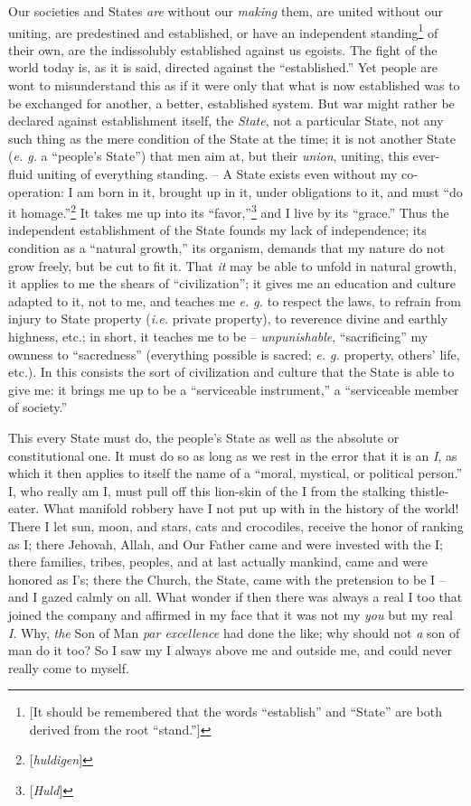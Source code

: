 \documentclass[12pt,a4paper]{book}
\begin{document}
Our societies and States \textit{are} without our \textit{making} them, are 
united without our uniting, are predestined and established, or have an 
independent standing\footnote{[It should be remembered that the words 
``establish'' and ``State'' are both derived from the root ``stand.'']} 
of their own, are the indissolubly established against us egoists. The fight 
of the world today is, as it is said, directed against the ``established.'' 
Yet people are wont to misunderstand this as if it were only that what is now 
established was to be exchanged for another, a better, established system. But 
war might rather be declared against establishment itself, the \textit{State}, 
not a particular State, not any such thing as the mere condition of the State 
at the time; it is not another State (\textit{e. g.} a ``people's State'') 
that men aim at, but their \textit{union}, uniting, this ever-fluid uniting of 
everything standing. -- A State exists even without my co-operation: I am born 
in it, brought up in it, under obligations to it, and must ``do it 
homage.''\footnote{[\textit{huldigen}]} It takes me up into its 
``favor,''\footnote{[\textit{Huld}]} and I live by its ``grace.'' Thus the 
independent establishment of the State founds my lack of independence; its 
condition as a ``natural growth,'' its organism, demands that my nature do 
not grow freely, but be cut to fit it. That \textit{it} may be able to unfold 
in natural growth, it applies to me the shears of ``civilization''; it gives 
me an education and culture adapted to it, not to me, and teaches me 
\textit{e. g.} to respect the laws, to refrain from injury to State property 
(\textit{i.e.} private property), to reverence divine and earthly highness, 
etc.; in short, it teaches me to be -- \textit{unpunishable}, 
``sacrificing'' my ownness to ``sacredness'' (everything possible is 
sacred; \textit{e. g.} property, others' life, etc.). In this consists the 
sort of civilization and culture that the State is able to give me: it brings 
me up to be a ``serviceable instrument,'' a ``serviceable member of 
society.''

This every State must do, the people's State as well as the absolute or 
constitutional one. It must do so as long as we rest in the error that it is 
an \textit{I}, as which it then applies to itself the name of a ``moral, 
mystical, or political person.'' I, who really am I, must pull off this 
lion-skin of the I from the stalking thistle-eater. What manifold robbery have 
I not put up with in the history of the world! There I let sun, moon, and 
stars, cats and crocodiles, receive the honor of ranking as I; there Jehovah, 
Allah, and Our Father came and were invested with the I; there families, 
tribes, peoples, and at last actually mankind, came and were honored as I's; 
there the Church, the State, came with the pretension to be I -- and I gazed 
calmly on all. What wonder if then there was always a real I too that joined 
the company and affirmed in my face that it was not my \textit{you} but my 
real \textit{I}. Why, \textit{the} Son of Man \textit{par excellence} had done 
the like; why should not \textit{a} son of man do it too? So I saw my I always 
above me and outside me, and could never really come to myself.
\end{document}

